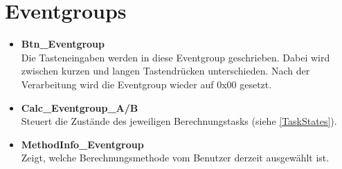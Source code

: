 \documentclass[ngerman,10pt,a4paper,titlepage]{report}
\begin{document}
	\section{Eventgroups}
	\begin{itemize}
		\item {\large \textbf{Btn\_Eventgroup}}\\
		Die Tasteneingaben werden in diese Eventgroup geschrieben. Dabei wird zwischen kurzen und langen Tastendrücken unterschieden. Nach der Verarbeitung wird die Eventgroup wieder auf 0x00 gesetzt.
		\item {\large \textbf{Calc\_Eventgroup\_A/B}}\\
		Steuert die Zustände des jeweiligen Berechnungstasks (siehe \ref{TaskStates}).
		\item {\large \textbf{MethodInfo\_Eventgroup}}\\
		Zeigt, welche Berechnungsmethode vom Benutzer derzeit ausgewählt ist.
	\end{itemize}\newpage
\end{document}
